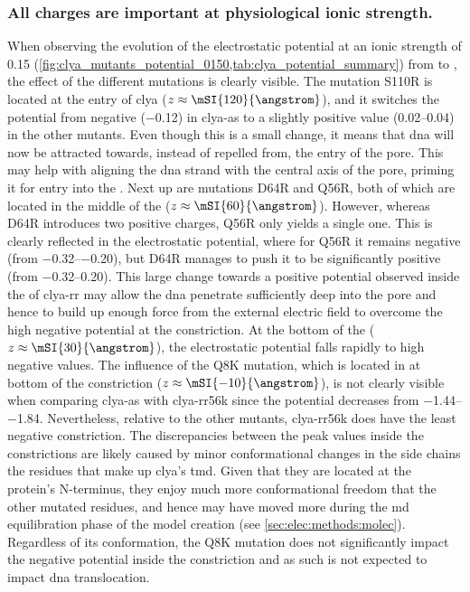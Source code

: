 \subsubsection{All charges are important at physiological ionic strength.}
%
%

When observing the evolution of the electrostatic potential at an ionic strength of \SI{0.15}{\Molar}
(\cref{fig:clya_mutants_potential_0150,tab:clya_potential_summary}) from \cisi{} to \transi{}, the effect of
the different mutations is clearly visible. The mutation S110R is located at the \cisi{} entry of \gls{clya}
($z \approx \mSI{120}{\angstrom}$), and it switches the potential from negative (\SI{-0.12}{\kTe}) in
\gls{clya-as} to a slightly positive value (\SIrange{+0.02}{0.04}{\kTe}) in the other mutants. Even though
this is a small change, it means that \gls{dna} will now be attracted towards, instead of repelled from, the
\cisi{} entry of the pore. This may help with aligning the \gls{dna} strand with the central axis of the pore,
priming it for entry into the \lumen{}. Next up are mutations D64R and Q56R, both of which are located in the
middle of the \lumen{} ($z \approx \mSI{60}{\angstrom}$). However, whereas D64R introduces two positive
charges, Q56R only yields a single one. This is clearly reflected in the electrostatic potential, where for
Q56R it remains negative (from \SIrange{-0.32}{-0.20}{\kTe}), but D64R manages to push it to be significantly
positive (from \SIrange{-0.32}{+0.20}{\kTe}). This large change towards a positive potential observed inside
the \lumen{} of \gls{clya-rr} may allow the \gls{dna} penetrate sufficiently deep into the pore and hence to
build up enough force from the external electric field to overcome the high negative potential at the
\transi{} constriction. At the bottom of the \lumen{} ($z \approx \mSI{30}{\angstrom}$), the electrostatic
potential falls rapidly to high negative values. The influence of the Q8K mutation, which is located in at
bottom of the constriction ($z \approx \mSI{-10}{\angstrom}$), is not clearly visible when comparing
\gls{clya-as} with \gls{clya-rr56k} since the potential decreases from \SIrange{-1.44}{-1.84}{\kTe}.
Nevertheless, relative to the other mutants, \gls{clya-rr56k} does have the least negative constriction. The
discrepancies between the peak values inside the constrictions are likely caused by minor conformational
changes in the side chains the residues that make up \gls{clya}'s \gls{tmd}.\footnotemark%
%
%
Given that they are located at the protein's N-terminus, they enjoy much more conformational freedom that the
other mutated residues, and hence may have moved more during the \gls{md} equilibration phase of the model
creation (see \cref{sec:elec:methods:molec}). Regardless of its conformation, the Q8K mutation does not
significantly impact the negative potential inside the constriction and as such is not expected to impact
\gls{dna} translocation. 


